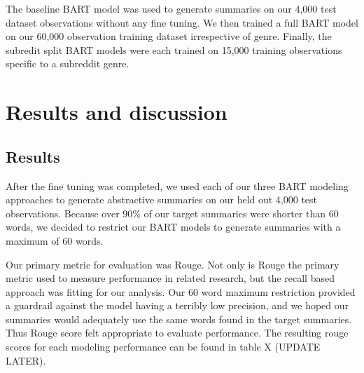 \documentclass[11pt,a4paper, twocolumn]{article}
\begin{document}
The baseline BART model was used to generate summaries on our 4,000 test dataset observations without any fine tuning.
We then trained a full BART model on our 60,000 observation training dataset irrespective of genre. 
Finally, the subredit split BART models were each trained on 15,000 training observations specific to a subreddit genre. 



\section{Results and discussion}

\subsection{Results}

After the fine tuning was completed, we used each of our three BART modeling approaches to generate abstractive summaries on 
our held out 4,000 test observations. Because over 90\% of our target summaries were shorter than 60 words, we decided to 
restrict our BART models to generate summaries with a maximum of 60 words. 

Our primary metric for evaluation was Rouge. 
Not only is Rouge the primary metric used to measure performance in related research, but the recall based approach 
was fitting for our analysis. Our 60 word maximum restriction provided a guardrail against the model having a terribly low precision, 
and we hoped our summaries would adequately use the same words found in the target summaries. 
Thus Rouge score felt appropriate to evaluate performance.
The resulting rouge scores for each modeling performance can be found in table X (UPDATE LATER).
\end{document}
